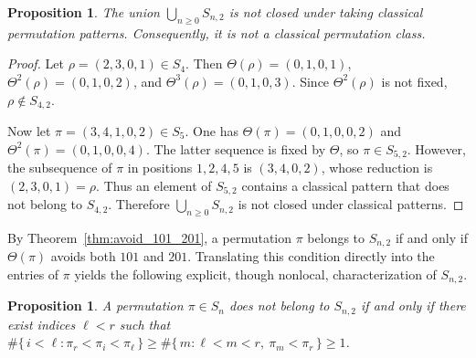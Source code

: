 \documentclass[11pt]{article}
\newtheorem{prop}[thm]{Proposition}
\theoremstyle{remark}
\theoremstyle{definition}
\begin{document}
\begin{prop}\label{prop:S2_not_classical}
The union $\bigcup_{n\geq0}S_{n,2}$ is not closed under taking classical permutation patterns. Consequently, it is not a classical permutation class.
\end{prop}

\begin{proof}
Let $\rho=(2,3,0,1)\in S_4$. Then $\Theta(\rho)=(0,1,0,1)$, $\Theta^2(\rho)=(0,1,0,2)$, and $\Theta^3(\rho)=(0,1,0,3)$. Since $\Theta^2(\rho)$ is not fixed, $\rho\notin S_{4,2}$.

Now let $\pi=(3,4,1,0,2)\in S_5$. One has $\Theta(\pi)=(0,1,0,0,2)$ and $\Theta^2(\pi)=(0,1,0,0,4)$. The latter sequence is fixed by $\Theta$, so $\pi\in S_{5,2}$. However, the subsequence of $\pi$ in positions $1,2,4,5$ is $(3,4,0,2)$, whose reduction is $(2,3,0,1)=\rho$. Thus an element of $S_{5,2}$ contains a classical pattern that does not belong to $S_{4,2}$. Therefore $\bigcup_{n\geq0}S_{n,2}$ is not closed under classical patterns.
\end{proof}

By Theorem~\ref{thm:avoid_101_201}, a permutation $\pi$ belongs to $S_{n,2}$ if and only if $\Theta(\pi)$ avoids both $101$ and $201$. Translating this condition directly into the entries of $\pi$ yields the following explicit, though nonlocal, characterization of $S_{n,2}$.

\begin{prop}\label{prop:Sn2}
A permutation $\pi\in S_n$ does not belong to $S_{n,2}$ if and only if
there exist indices $\ell<r$ such that 
$\#\{\,i<\ell:\pi_r<\pi_i<\pi_\ell\,\}
\ge
\#\{\,m:\ell<m<r,\ \pi_m<\pi_r\,\}
\ge 1$.
\end{prop}
\end{document}
